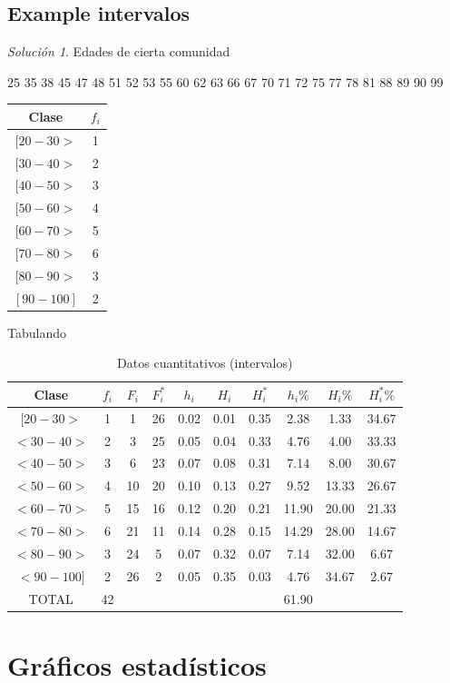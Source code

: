\documentclass[10pt,]{krantz}
\theoremstyle{definition}
\theoremstyle{definition}
\theoremstyle{definition}
\theoremstyle{definition}
\theoremstyle{remark}
\newtheorem*{solution}{Solución}
\begin{document}
\hypertarget{example-intervalos}{%
\section{Example intervalos}\label{example-intervalos}}

\begin{solution}
{}
Edades de cierta comunidad

25
35 38
45 47 48
51 52 53 55
60 62 63 66 67
70 71 72 75 77 78
81 88 89
90 99

\begin{longtable}[]{@{}cc@{}}
\toprule
Clase & \(f_i\)\tabularnewline
\midrule
\endhead
\([20-30>\) & 1\tabularnewline
\([30-40>\) & 2\tabularnewline
\([40-50>\) & 3\tabularnewline
\([50-60>\) & 4\tabularnewline
\([60-70>\) & 5\tabularnewline
\([70-80>\) & 6\tabularnewline
\([80-90>\) & 3\tabularnewline
\([90-100]\) & 2\tabularnewline
\bottomrule
\end{longtable}
\end{solution}

Tabulando

\begin{longtable}[t]{cccccccccc}
\caption{\label{tab:cuantitativa}Datos cuantitativos (intervalos)}\\
\toprule
Clase & $f_i$ & $F_i$ & $F_i^*$ & $h_i$ & $H_i$ & $H_i^*$ & $h_i\%$ & $H_i\%$ & $H_i^*\%$\\
\midrule
$[20-30>$ & 1 & 1 & 26 & 0.02 & 0.01 & 0.35 & 2.38 & 1.33 & 34.67\\
$<30-40>$ & 2 & 3 & 25 & 0.05 & 0.04 & 0.33 & 4.76 & 4.00 & 33.33\\
$<40-50>$ & 3 & 6 & 23 & 0.07 & 0.08 & 0.31 & 7.14 & 8.00 & 30.67\\
$<50-60>$ & 4 & 10 & 20 & 0.10 & 0.13 & 0.27 & 9.52 & 13.33 & 26.67\\
$<60-70>$ & 5 & 15 & 16 & 0.12 & 0.20 & 0.21 & 11.90 & 20.00 & 21.33\\
$<70-80>$ & 6 & 21 & 11 & 0.14 & 0.28 & 0.15 & 14.29 & 28.00 & 14.67\\
$<80-90>$ & 3 & 24 & 5 & 0.07 & 0.32 & 0.07 & 7.14 & 32.00 & 6.67\\
$<90-100]$ & 2 & 26 & 2 & 0.05 & 0.35 & 0.03 & 4.76 & 34.67 & 2.67\\
TOTAL & 42 &  &  &  &  &  & 61.90 &  & \\
\bottomrule
\end{longtable}

\hypertarget{gruxe1ficos-estaduxedsticos}{%
\chapter{Gráficos estadísticos}\label{gruxe1ficos-estaduxedsticos}}
\end{document}

